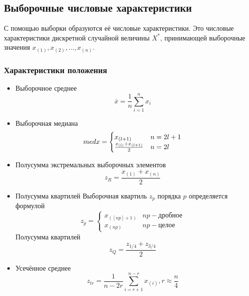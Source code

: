 \documentclass{article}
\begin{document}
	\subsection{Выборочные числовые характеристики}
	\noindent С помощью выборки образуются её числовые характеристики. Это числовые характеристики дискретной случайной величины $X^{*}$, принимающей выборочные значения $x_{(1)}, x_{(2)}, \ldots, x_{(n)}$.
	
	\subsubsection{Характеристики положения}
	\begin{itemize}
		\item Выборочное среднее \begin{equation}
									 \overline{x} = \frac{1}{n}\sum_{i=1}^{n}{x_i}
								\end{equation}
		\item Выборочная медиана \begin{equation}
								 	med x = \begin{cases}
											 	x_{(l+1)} &\text{$ n=2l+1$}\\
											 	\frac{x_{(l)} + x_{(l+1)}}{2} &\text{$ n=2l$}
								 			\end{cases}
								 \end{equation}
		\item Полусумма экстремальных выборочных элементов \begin{equation}
														       z_R = \frac{x_{(1)} + x_{(n)}}{2}
														   \end{equation}
		\item Полусумма квартилей \newline Выборочная квартиль $z_p$ порядка $p$ определяется формулой \begin{equation}
				 	z_p = \begin{cases}
		             	  	x_{([np]+1)} &\text{$np - $дробное}\\
		      			    x_{(np)}&\text{$np - $целое}
		      			  \end{cases}
				 \end{equation}
				 Полусумма квартилей \begin{equation}
				 					 	z_Q = \frac{z_{1/4} + z_{3/4}}{2}
				 					 \end{equation}
		\item Усечённое среднее\begin{equation}
							   		z_{tr} = \frac{1}{n-2r}\sum_{i=r+1}^{n-r}{x_{(i)}}, r\approx\frac{n}{4}	   	\end{equation}
	\end{itemize}
\end{document}
